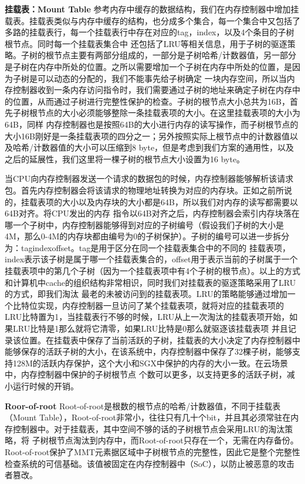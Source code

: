 \textbf{挂载表：Mount Table}
参考内存中缓存的数据结构，我们在内存控制器中增加挂载表。挂载表类似与内存中缓存的结构，也分成多个集合，每一个集合中又包括了多路的挂载表行，每一个挂载表行中存在对应的tag，index，以及4个条目的子树根节点。同时每一个挂载表集合中
还包括了LRU等相关信息，用于子树的驱逐策略。子树的根节点主要有两部分组成的，一部分是子树哈希/计数器值，另一部分是子树在内存中所处的位置。之所以需要增加一个子树在内存中所处的位置，是因为子树是可以动态的分配的，我们不能事先给子树确定
一块内存空间，所以当内存控制器收到一条内存访问指令时，我们需要通过子树的地址来确定子树在内存中的位置，从而通过子树进行完整性保护的检查。子树的根节点大小总共为16B，首先子树根节点的大小必须能够整除一条挂载表项的大小。在这里挂载表项的大小为64B，同样
内存控制器也是按照64B的大小进行内存的读写操作，而子树根节点的大小16B刚好是一条挂载表项的四分之一；另外按照实际上根节点中的计数器值以及哈希/计数器值的大小可以压缩到8 byte，但是考虑到我们方案的通用性，以及之后的延展性，我们这里将一棵子树的根节点大小设置为16 byte。

当CPU向内存控制器发送一个请求的数据包的时候，内存控制器能够解析该请求包。首先内存控制器会将该请求的物理地址转换为对应的内存块。正如之前所说的，挂载表项的大小以及内存块的大小都是64B，所以我们对内存的读写都需要以64B对齐。将CPU发出的内存
指令以64B对齐之后，内存控制器会索引内存块落在哪一个子树中，内存控制器能够得到对应的子树编号（假设我们子树的大小是4M，那么0-4M的内存块都由编号为0的子树保护）。子树的编号可以进一步拆分为：tag\cdot index\cdot offset。tag是用于区分在同一个挂载表集合中的不同的
挂载表项，index表示该子树是属于哪一个挂载表集合的，offset用于表示当前的子树属于一个挂载表项中的第几个子树（因为一个挂载表项中有4个子树的根节点）。以上的方式和计算机中cache的组织结构非常相识，同时我们对挂载表的驱逐策略采用了LRU的方式，即我们淘汰
最老的未被访问到的挂载表项。LRU的策略能够通过增加一个比特位实现，内存控制器一旦访问了某个挂载表项，就将对应的挂载表项的LRU比特置为1，当挂载表行不够的时候，LRU从上一次淘汰的挂载表项开始，如果LRU比特是1那么就将它清零，如果LRU比特是0那么就驱逐该挂载表项
并且记录该位置。在挂载表中保存了当前活跃的子树，挂载表的大小决定了内存控制器中能够保存的活跃子树的大小，在该系统中，内存控制器中保存了32棵子树，能够支持128M的活跃内存保护，这个大小和SGX中保护的内存的大小一致。在云场景中，内存控制器中保护的子树根节点
个数可以更多，以支持更多的活跃子树，减小运行时候的开销。

\textbf{Roor-of-root}
Root-of-root是根数的根节点的哈希/计数器值，不同于挂载表（Mount Table），Root-of-root非常小，往往只有几十个bit，并且其必须常驻在内存控制器中。对于挂载表，其中空间不够的话的子树根节点会采用LRU的淘汰策略，将
子树根节点淘汰到内存中，而Root-of-root只存在一个，无需在内存备份。Root-of-root保护了MMT元素据区域中子树根节点的完整性，因此它是整个完整性检查系统的可信基础。该值被固定在内存控制器中（SoC），以防止被恶意的攻击者篡改。

